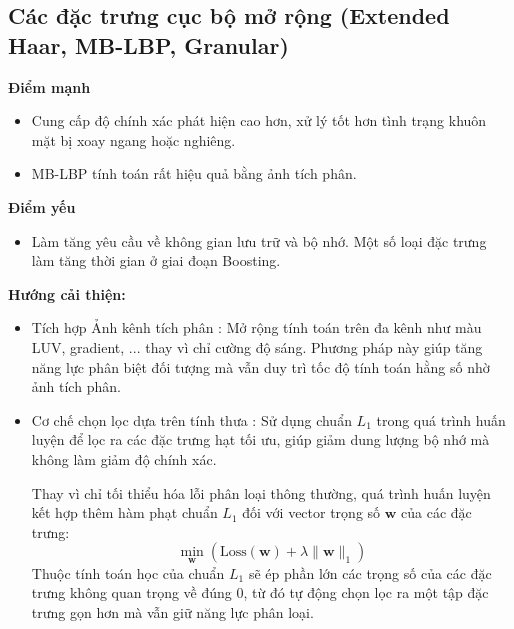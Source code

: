 \subsection{Các đặc trưng cục bộ mở rộng (Extended Haar, MB-LBP, Granular)}
\textbf{Điểm mạnh}
\begin{itemize}
    \item Cung cấp độ chính xác phát hiện cao hơn, xử lý tốt hơn tình trạng khuôn mặt bị xoay ngang hoặc nghiêng.
    \item MB-LBP tính toán rất hiệu quả bằng ảnh tích phân.
\end{itemize}
\textbf{Điểm yếu}
\begin{itemize}
    \item Làm tăng yêu cầu về không gian lưu trữ và bộ nhớ. Một số loại đặc trưng làm tăng thời gian ở giai đoạn Boosting.
\end{itemize}
\textbf{Hướng cải thiện:}
\begin{itemize}
  \item Tích hợp Ảnh kênh tích phân \cite{dollar2009integral}: Mở rộng tính toán trên đa kênh như màu LUV, gradient, ... thay vì chỉ cường độ sáng. Phương pháp này giúp tăng năng lực phân biệt đối tượng mà vẫn duy trì tốc độ tính toán hằng số nhờ ảnh tích phân.
  \item Cơ chế chọn lọc dựa trên tính thưa \cite{zhang2010local}: Sử dụng chuẩn $L_1$ trong quá trình huấn luyện để lọc ra các đặc trưng hạt tối ưu, giúp giảm dung lượng bộ nhớ mà không làm giảm độ chính xác.
  
  Thay vì chỉ tối thiểu hóa lỗi phân loại thông thường, quá trình huấn luyện kết hợp thêm hàm phạt chuẩn $L_1$ đối với vector trọng số $\mathbf{w}$ của các đặc trưng:
    \begin{equation}
        \min_{\mathbf{w}} \left( \text{Loss}(\mathbf{w}) + \lambda \|\mathbf{w}\|_1 \right)
    \end{equation}
    Thuộc tính toán học của chuẩn $L_1$ sẽ ép phần lớn các trọng số của các đặc trưng không quan trọng về đúng $0$, từ đó tự động chọn lọc ra một tập đặc trưng gọn hơn mà vẫn giữ năng lực phân loại.
\end{itemize}

